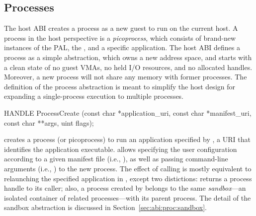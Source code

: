 \subsection{Processes}
\label{sec:abi:proc}


The host ABI creates a process as a new guest to run on the current host.
A process in the host perspective is a {\em picoprocess}, which consists of brand-new instances
of the PAL, the \libos{}, and a specific application.
The host ABI defines a process
as a simple abstraction, which owns a new address space, and starts with a clean state of no guest VMAs, no held I/O resources, and no allocated handles.
Moreover, a new process will not share any memory with former processes.
The definition of the process abstraction
is meant to simplify the host design for expanding a single-process execution to multiple processes.








\begin{paldef}
HANDLE ProcessCreate (const char *application_uri,
                      const char *manifest_uri,
                      const char **args, uint flags);
\end{paldef}


 creates a process (or picoprocess) to run an application specified by
, a URI that identifies the application executable.
 allows specifying the user configuration
according to a given manifest file (i.e., ), as well as passing command-line arguments (i.e., ) to the new process.
The effect of calling  is mostly equivalent to
relaunching the specified application in \graphene{},
except two distictions:  returns a process handle to its caller;
also, a process created by  belongs to the same {\em sandbox}---an isolated container of related processes---with its parent process.
The detail of the sandbox abstraction is discussed in Section~\ref{sec:abi:proc:sandbox}.




